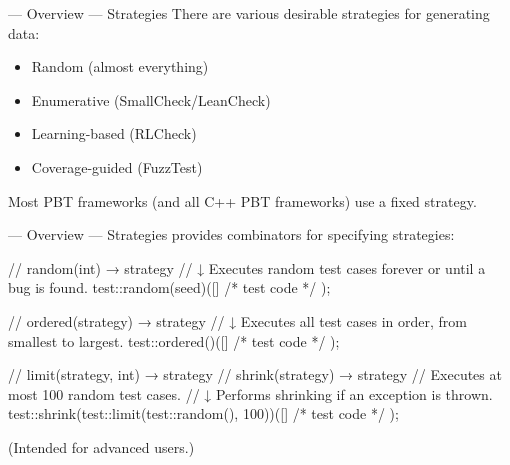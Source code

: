 
\begin{frame}{\halcheck{} --- Overview --- Strategies}
  There are various desirable strategies for generating data:
  \begin{itemize}
    \item Random (almost everything)
    \item Enumerative (SmallCheck/LeanCheck) \pause{}
    \item Learning-based (RLCheck)
    \item Coverage-guided (FuzzTest) \pause{}
  \end{itemize}

  Most PBT frameworks (and all C++ PBT frameworks) use a \alert{fixed strategy}.
\end{frame}

\begin{frame}[fragile]{\halcheck{} --- Overview --- Strategies}
  \halcheck{} provides combinators for specifying strategies:

  \begin{cppcode}
    //   random(int) → strategy
    // ↓ Executes random test cases forever or until a bug is found.
    test::random(seed)([] { /* test code */ });
  \end{cppcode}

  \pause{}

  \begin{cppcode}
    //   ordered(strategy) → strategy
    // ↓ Executes all test cases in order, from smallest to largest.
    test::ordered()([] { /* test code */ });
  \end{cppcode}

  \pause{}

  \begin{cppcode}
    //   limit(strategy, int) → strategy
    //   shrink(strategy) → strategy
    //   Executes at most 100 random test cases.
    // ↓ Performs shrinking if an exception is thrown.
    test::shrink(test::limit(test::random(), 100))([] { /* test code */ });
  \end{cppcode}

  \pause{}

  (Intended for advanced users.)
\end{frame}


